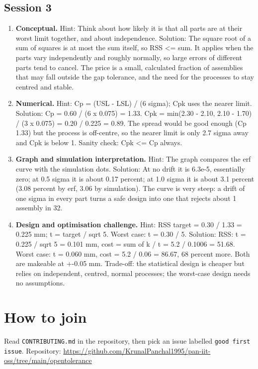 \documentclass[11pt,a4paper]{article}
\begin{document}
\subsection*{Session 3}
\begin{enumerate}[nosep]
\item \textbf{Conceptual.} Hint: Think about how likely it is that all parts are at their worst limit together, and about independence. Solution: The square root of a sum of squares is at most the sum itself, so RSS \textless{}= sum. It applies when the parts vary independently and roughly normally, so large errors of different parts tend to cancel. The price is a small, calculated fraction of assemblies that may fall outside the gap tolerance, and the need for the processes to stay centred and stable.
\item \textbf{Numerical.} Hint: Cp = (USL - LSL) / (6 sigma); Cpk uses the nearer limit. Solution: Cp = 0.60 / (6 x 0.075) = 1.33. Cpk = min(2.30 - 2.10, 2.10 - 1.70) / (3 x 0.075) = 0.20 / 0.225 = 0.89. The spread would be good enough (Cp 1.33) but the process is off-centre, so the nearer limit is only 2.7 sigma away and Cpk is below 1. Sanity check: Cpk \textless{}= Cp always.
\item \textbf{Graph and simulation interpretation.} Hint: The graph compares the erf curve with the simulation dots. Solution: At no drift it is 6.3e-5, essentially zero; at 0.5 sigma it is about 0.17 percent; at 1.0 sigma it is about 3.1 percent (3.08 percent by erf, 3.06 by simulation). The curve is very steep: a drift of one sigma in every part turns a safe design into one that rejects about 1 assembly in 32.
\item \textbf{Design and optimisation challenge.} Hint: RSS target = 0.30 / 1.33 = 0.225 mm; t = target / sqrt 5. Worst case: t = 0.30 / 5. Solution: RSS: t = 0.225 / sqrt 5 = 0.101 mm, cost = sum of k / t = 5.2 / 0.1006 = 51.68. Worst case: t = 0.060 mm, cost = 5.2 / 0.06 = 86.67, 68 percent more. Both are makeable at +-0.05 mm. Trade-off: the statistical design is cheaper but relies on independent, centred, normal processes; the worst-case design needs no assumptions.
\end{enumerate}

\section{How to join}
Read \texttt{CONTRIBUTING.md} in the repository, then pick an issue labelled \texttt{good first issue}. Repository: \url{https://github.com/KrunalPanchal1995/pan-iit-oss/tree/main/opentolerance}
\end{document}
